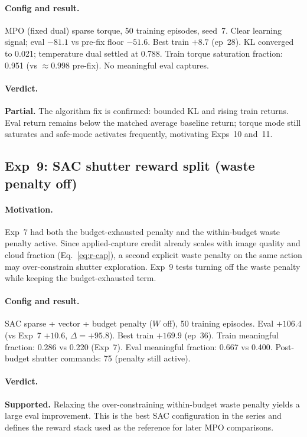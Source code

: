 \paragraph{Config and result.}
MPO (fixed dual) sparse torque, 50 training episodes, seed~7.
Clear learning signal; eval $-81.1$ vs pre-fix floor $-51.6$.
Best train $+8.7$ (ep~28).
KL converged to 0.021; temperature dual settled at 0.788.
Train torque saturation fraction: 0.951 (vs $\approx 0.998$ pre-fix).
No meaningful eval captures.

\paragraph{Verdict.}
\textbf{Partial.}
The algorithm fix is confirmed: bounded KL and rising train returns.
Eval return remains below the matched average baseline return; torque mode still saturates and safe-mode activates frequently, motivating Exps~10 and~11.

\subsection{Exp~9: SAC shutter reward split (waste penalty off)}
\label{sec:exp9}

\paragraph{Motivation.}
Exp~7 had both the budget-exhausted penalty and the within-budget waste penalty active.
Since applied-capture credit already scales with image quality and cloud fraction (Eq.~\ref{eq:r-cap}),
a second explicit waste penalty on the same action may over-constrain shutter exploration.
Exp~9 tests turning off the waste penalty while keeping the budget-exhausted term.

\paragraph{Config and result.}
SAC sparse + vector + budget penalty ($W$ off), 50 training episodes.
Eval $+106.4$ (vs Exp~7 $+10.6$, $\Delta=+95.8$).
Best train $+169.9$ (ep~36).
Train meaningful fraction: 0.286 vs 0.220 (Exp~7).
Eval meaningful fraction: 0.667 vs 0.400.
Post-budget shutter commands: 75 (penalty still active).

\paragraph{Verdict.}
\textbf{Supported.}
Relaxing the over-constraining within-budget waste penalty yields a large eval improvement.
This is the best SAC configuration in the series and defines the reward stack used as the reference for later MPO comparisons.


